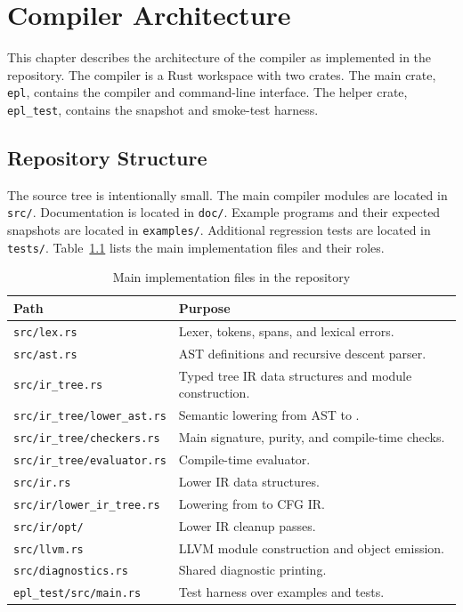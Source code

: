 \chapter{Compiler Architecture}
\label{chap:architecture}

This chapter describes the architecture of the \epl{} compiler as implemented in
the repository. The compiler is a Rust workspace with two crates. The main crate,
\texttt{epl}, contains the compiler and command-line interface. The helper crate,
\texttt{epl\_test}, contains the snapshot and smoke-test harness.

\section{Repository Structure}

The source tree is intentionally small. The main compiler modules are located in
\texttt{src/}. Documentation is located in \texttt{doc/}. Example programs and
their expected \irtree{} snapshots are located in \texttt{examples/}. Additional
regression tests are located in \texttt{tests/}.
Table~\ref{tab:repo-files} lists the main implementation files and their roles.

\begin{table}[H]
  \centering
  \footnotesize
  \begin{tabular}{p{}p{}}
    \toprule
    Path & Purpose \\
    \midrule
    \texttt{src/lex.rs} & Lexer, tokens, spans, and lexical errors. \\
    \texttt{src/ast.rs} & AST definitions and recursive descent parser. \\
    \texttt{src/ir\_tree.rs} & Typed tree IR data structures and module construction. \\
    \texttt{src/ir\_tree/lower\_ast.rs} & Semantic lowering from AST to \irtree{}. \\
    \texttt{src/ir\_tree/checkers.rs} & Main signature, purity, and compile-time checks. \\
    \texttt{src/ir\_tree/evaluator.rs} & Compile-time evaluator. \\
    \texttt{src/ir.rs} & Lower IR data structures. \\
    \texttt{src/ir/lower\_ir\_tree.rs} & Lowering from \irtree{} to CFG IR. \\
    \texttt{src/ir/opt/} & Lower IR cleanup passes. \\
    \texttt{src/llvm.rs} & LLVM module construction and object emission. \\
    \texttt{src/diagnostics.rs} & Shared diagnostic printing. \\
    \texttt{epl\_test/src/main.rs} & Test harness over examples and tests. \\
    \bottomrule
  \end{tabular}
  \caption{Main implementation files in the \epl{} repository}
  \label{tab:repo-files}
\end{table}

